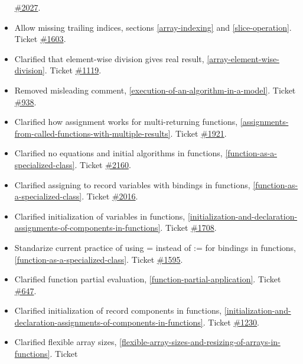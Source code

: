 \begin{itemize}
  \href{https://github.com/modelica/ModelicaSpecification/issues/2027}{\#2027}.
\item
  Allow missing trailing indices, sections \autoref{array-indexing} and \autoref{slice-operation}. Ticket
  \href{https://github.com/modelica/ModelicaSpecification/issues/1603}{\#1603}.
\item
  Clarified that element-wise division gives real result,
  \autoref{array-element-wise-division}. Ticket
  \href{https://github.com/modelica/ModelicaSpecification/issues/1119}{\#1119}.
\item
  Removed misleading comment, \autoref{execution-of-an-algorithm-in-a-model}. Ticket
  \href{https://github.com/modelica/ModelicaSpecification/issues/938}{\#938}.
\item
  Clarified how assignment works for multi-returning functions,
  \autoref{assignments-from-called-functions-with-multiple-results}. Ticket
  \href{https://github.com/modelica/ModelicaSpecification/issues/1921}{\#1921}.
\item
  Clarified no equations and initial algorithms in functions,
  \autoref{function-as-a-specialized-class}. Ticket
  \href{https://github.com/modelica/ModelicaSpecification/issues/2160}{\#2160}.
\item
  Clarified assigning to record variables with bindings in functions,
  \autoref{function-as-a-specialized-class}. Ticket
  \href{https://github.com/modelica/ModelicaSpecification/issues/2016}{\#2016}.
\item
  Clarified initialization of variables in functions, \autoref{initialization-and-declaration-assignments-of-components-in-functions}.
  Ticket \href{https://github.com/modelica/ModelicaSpecification/issues/1708}{\#1708}.
\item
  Standarize current practice of using = instead of := for bindings in
  functions, \autoref{function-as-a-specialized-class}. Ticket
  \href{https://github.com/modelica/ModelicaSpecification/issues/1595}{\#1595}.
\item
  Clarified function partial evaluation, \autoref{function-partial-application}. Ticket
  \href{https://github.com/modelica/ModelicaSpecification/issues/647}{\#647}.
\item
  Clarified initialization of record components in functions,
  \autoref{initialization-and-declaration-assignments-of-components-in-functions}. Ticket
  \href{https://github.com/modelica/ModelicaSpecification/issues/1230}{\#1230}.
\item
  Clarified flexible array sizes, \autoref{flexible-array-sizes-and-resizing-of-arrays-in-functions}. Ticket

\end{itemize}
